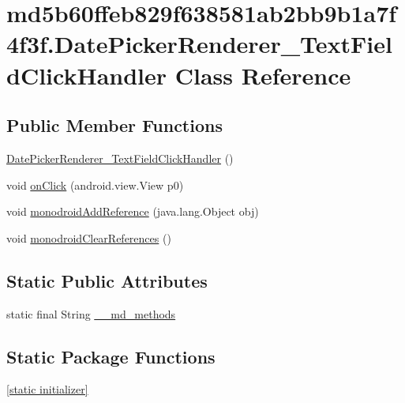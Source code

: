\hypertarget{classmd5b60ffeb829f638581ab2bb9b1a7f4f3f_1_1_date_picker_renderer___text_field_click_handler}{
\section{md5b60ffeb829f638581ab2bb9b1a7f4f3f.DatePickerRenderer\_\-TextFieldClickHandler Class Reference}
\label{classmd5b60ffeb829f638581ab2bb9b1a7f4f3f_1_1_date_picker_renderer___text_field_click_handler}
}
\subsection*{Public Member Functions}
\begin{CompactItemize}
\item 
\hyperlink{classmd5b60ffeb829f638581ab2bb9b1a7f4f3f_1_1_date_picker_renderer___text_field_click_handler_4693a3ab453623ea19b92342908cbe4c}{DatePickerRenderer\_\-TextFieldClickHandler} ()
\item 
void \hyperlink{classmd5b60ffeb829f638581ab2bb9b1a7f4f3f_1_1_date_picker_renderer___text_field_click_handler_81aff3313b735fa41253b3b3077d3100}{onClick} (android.view.View p0)
\item 
void \hyperlink{classmd5b60ffeb829f638581ab2bb9b1a7f4f3f_1_1_date_picker_renderer___text_field_click_handler_2ddca20446ecf95867da36dea5970d47}{monodroidAddReference} (java.lang.Object obj)
\item 
void \hyperlink{classmd5b60ffeb829f638581ab2bb9b1a7f4f3f_1_1_date_picker_renderer___text_field_click_handler_924d13da38fad223fa897e122738eb21}{monodroidClearReferences} ()
\end{CompactItemize}
\subsection*{Static Public Attributes}
\begin{CompactItemize}
\item 
static final String \hyperlink{classmd5b60ffeb829f638581ab2bb9b1a7f4f3f_1_1_date_picker_renderer___text_field_click_handler_8220432a20203dce9a5e72418b7e64a1}{\_\-\_\-md\_\-methods}
\end{CompactItemize}
\subsection*{Static Package Functions}
\begin{CompactItemize}
\item 
\hyperlink{classmd5b60ffeb829f638581ab2bb9b1a7f4f3f_1_1_date_picker_renderer___text_field_click_handler_9e931bc18381b8e371e3b0bcc07efc60}{\mbox{[}static initializer\mbox{]}}
\end{CompactItemize}
